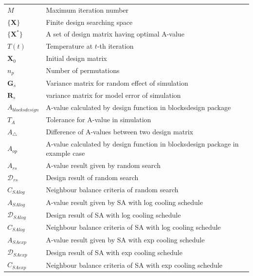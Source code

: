 \documentclass[
  a4paper,
  oneside,
  openany,
  12pt,
  onecolumn]{book}
\theoremstyle{definition}
\theoremstyle{definition}
\theoremstyle{plain}
\theoremstyle{remark}
\begin{document}
\begin{longtable}[]{@{}
  >{\raggedright\arraybackslash}p{}
  >{\raggedright\arraybackslash}p{}@{}}
\(M\) & Maximum iteration number \\
\(\{\boldsymbol{X}\}\) & Finite design searching space \\
\(\{\boldsymbol{X}^*\}\) & A set of design matrix having optimal
A-value \\
\(T(t)\) & Temperature at \(t\)-th iteration \\
\(\boldsymbol{X}_0\) & Initial design matrix \\
\(n_p\) & Number of permutations \\
\(\boldsymbol{G}_s\) & Variance matrix for random effect of
simulation \\
\(\boldsymbol{R}_s\) & variance matrix for model error of simulation \\
\(A_{blocksdesign}\) & A-value calculated by design function in
blocksdesign package \\
\(T_A\) & Tolerance for A-value in simulation \\
\(A_{\bigtriangleup}\) & Difference of A-values between two design
matrix \\
\(A_{op}\) & A-value calculated by design function in blocksdesign
package in example case \\
\(A_{rs}\) & A-value result given by random search \\
\(\mathcal{D}_{rs}\) & Design result of random search \\
\(C_{SAlog}\) & Neighbour balance criteria of random search \\
\(A_{SAlog}\) & A-value result given by SA with log cooling schedule \\
\(\mathcal{D}_{SAlog}\) & Design result of SA with log cooling
schedule \\
\(C_{SAlog}\) & Neighbour balance criteria of SA with log cooling
schedule \\
\(A_{SAexp}\) & A-value result given by SA with exp cooling schedule \\
\(\mathcal{D}_{SAexp}\) & Design result of SA with exp cooling
schedule \\
\(C_{SAexp}\) & Neighbour balance criteria of SA with exp cooling
schedule \\
\end{longtable}
\end{document}
